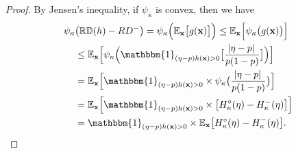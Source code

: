 \documentclass[letterpaper]{article} %
\newcommand{\X}{\mathbf{X}}
\newcommand{\x}{\mathbf{x}}
\newcommand{\E}{\mathbb{E}}
\newcommand{\I}{\mathbbm{1}}
\newcommand{\RD}{\mathbb{RD}}
\newcommand{\crd}{C^{\eta}}
\begin{document}
\begin{proof}
	By Jensen's inequality, if $\psi_{\kappa}$ is convex, then we have
	\begin{align*}
		\psi_{\kappa} & \big( \RD(h) - RD^{-} \big)  = \psi_{\kappa} \Big( \E_\x \big[ g(\x) \big] \Big)   \leq  \E_\x \Big[ \psi_{\kappa} \big( g(\x) \big) \Big] \\
		                                           & \leq \E_\x \Big[ \psi_{\kappa} \Big( \I_{( \eta - p )  h(\x) > 0} \big[ \frac{ \abs{ \eta - p } }{p(1-p)} \big]  \Big) \Big] \\
		                                           & =  \E_\x \Big[  \I_{( \eta - p )  h(\x) > 0} \times \psi_{\kappa} \big(  \frac{ \abs{ \eta - p } }{p(1-p)} \big) \Big]       \\
		                                           & =  \E_\x \Big[  \I_{( \eta - p )  h(\x) > 0} \times \big[ H^{\circ}_{\kappa} ( \eta ) - H^{-}_{\kappa} ( \eta ) \big] \Big]  \\
		                                           & = \I_{( \eta - p )  h(\x) > 0} \times \E_\x  \big[ H^{\circ}_{\kappa} ( \eta ) - H^{-}_{\kappa} ( \eta ) \big] .
	\end{align*}



\end{proof}
\end{document}
